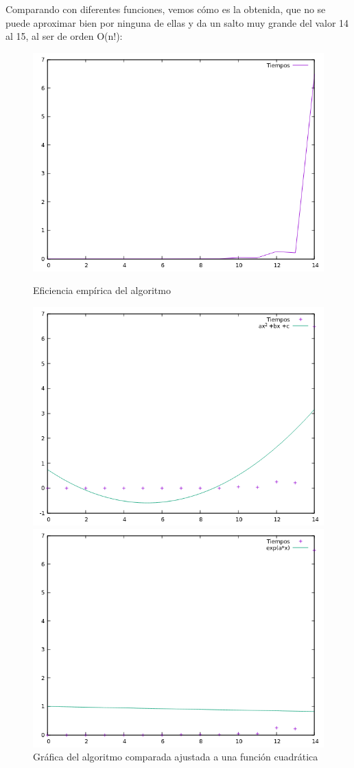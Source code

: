\documentclass[12pt]{article}
\begin{document}
Comparando con diferentes funciones, vemos cómo es la obtenida, que no se puede aproximar bien por ninguna de ellas y da un salto muy grande del valor 14 al 15, al ser de orden O(n!):
\begin{figure}[h]
	\centering
	\includegraphics[scale=0.5]{../images/tiempos.png}
	\caption{Eficiencia empírica del algoritmo}
	\includegraphics[scale=0.5]{../images/cuadratica.png}
	\caption{Gráfica del algoritmo comparada ajustada a una función cuadrática}
	\includegraphics[scale=0.5]{../images/exp_plot.png}

\end{figure}
\end{document}
